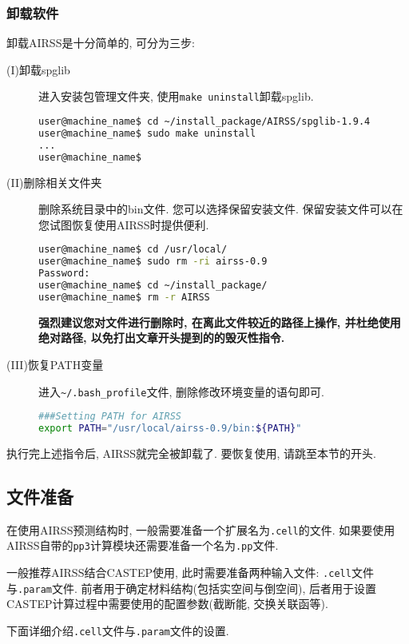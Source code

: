 \documentclass[a4paper, 10pt]{article}
\begin{document}
      \subsubsection{卸载软件}
      卸载AIRSS是十分简单的, 可分为三步:
      \begin{description}
        \item [(I)卸载spglib] 进入安装包管理文件夹, 使用\verb|make uninstall|卸载spglib.
        \begin{lstlisting}[language={bash}]
user@machine_name$ cd ~/install_package/AIRSS/spglib-1.9.4
user@machine_name$ sudo make uninstall
...
user@machine_name$
        \end{lstlisting}

        \item [(II)删除相关文件夹] 删除系统目录中的bin文件. 您可以选择保留安装文件. 保留安装文件可以在您试图恢复使用AIRSS时提供便利.
        \begin{lstlisting}[language={bash}]
user@machine_name$ cd /usr/local/
user@machine_name$ sudo rm -ri airss-0.9 
Password:
user@machine_name$ cd ~/install_package/
user@machine_name$ rm -r AIRSS
        \end{lstlisting}

        \textbf{强烈建议您对文件进行删除时, 在离此文件较近的路径上操作, 并杜绝使用绝对路径, 以免打出文章开头提到的的毁灭性指令.}

        \item [(III)恢复PATH变量] 进入\verb|~/.bash_profile|文件, 删除修改环境变量的语句即可.
        \begin{lstlisting}[language={bash}]
###Setting PATH for AIRSS
export PATH="/usr/local/airss-0.9/bin:${PATH}"
        \end{lstlisting}
      \end{description}
      执行完上述指令后, AIRSS就完全被卸载了. 要恢复使用, 请跳至本节的开头.
    \subsection{文件准备}
      在使用AIRSS预测结构时, 一般需要准备一个扩展名为\verb|.cell|的文件. 如果要使用AIRSS自带的\verb|pp3|计算模块还需要准备一个名为\verb|.pp|文件.

      一般推荐AIRSS结合CASTEP使用, 此时需要准备两种输入文件: \verb|.cell|文件与\verb|.param|文件. 前者用于确定材料结构(包括实空间与倒空间), 后者用于设置CASTEP计算过程中需要使用的配置参数(截断能, 交换关联函等).

      下面详细介绍\verb|.cell|文件与\verb|.param|文件的设置.
\end{document}
